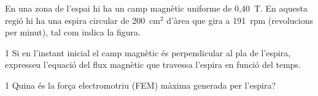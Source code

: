 En una zona de l'espai hi ha un camp magnètic uniforme de 0,40~T. En aquesta regió hi ha una espira circular de 200~cm$^2$ d'àrea que gira a 191~rpm (revolucions per minut), tal com indica la figura.


\begin{apartat}{1}
Si en l'instant inicial el camp magnètic és perpendicular al pla de l'espira, expresseu l'equació del flux magnètic que travessa l'espira en funció del temps.
\end{apartat}

\begin{apartat}{1}
Quina és la força electromotriu (FEM) màxima generada per l'espira?
\end{apartat}
